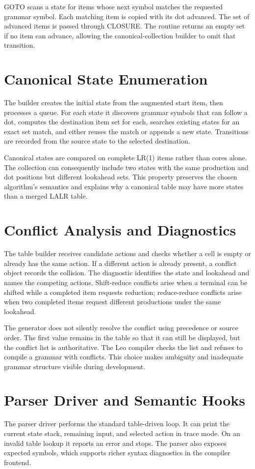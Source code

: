 \documentclass[12pt,a4paper,oneside]{report}
\begin{document}
GOTO scans a state for items whose next symbol matches the requested grammar symbol. Each matching item is copied with its dot advanced. The set of advanced items is passed through CLOSURE. The routine returns an empty set if no item can advance, allowing the canonical-collection builder to omit that transition.

\section{Canonical State Enumeration}
The builder creates the initial state from the augmented start item, then processes a queue. For each state it discovers grammar symbols that can follow a dot, computes the destination item set for each, searches existing states for an exact set match, and either reuses the match or appends a new state. Transitions are recorded from the source state to the selected destination.

Canonical states are compared on complete LR(1) items rather than cores alone. The collection can consequently include two states with the same production and dot positions but different lookahead sets. This property preserves the chosen algorithm's semantics and explains why a canonical table may have more states than a merged LALR table.

\section{Conflict Analysis and Diagnostics}
The table builder receives candidate actions and checks whether a cell is empty or already has the same action. If a different action is already present, a conflict object records the collision. The diagnostic identifies the state and lookahead and names the competing actions. Shift-reduce conflicts arise when a terminal can be shifted while a completed item requests reduction; reduce-reduce conflicts arise when two completed items request different productions under the same lookahead.

The generator does not silently resolve the conflict using precedence or source order. The first value remains in the table so that it can still be displayed, but the conflict list is authoritative. The Leo compiler checks the list and refuses to compile a grammar with conflicts. This choice makes ambiguity and inadequate grammar structure visible during development.

\section{Parser Driver and Semantic Hooks}
The parser driver performs the standard table-driven loop. It can print the current state stack, remaining input, and selected action in trace mode. On an invalid table lookup it reports an error and stops. The parser also exposes expected symbols, which supports richer syntax diagnostics in the compiler frontend.
\end{document}

